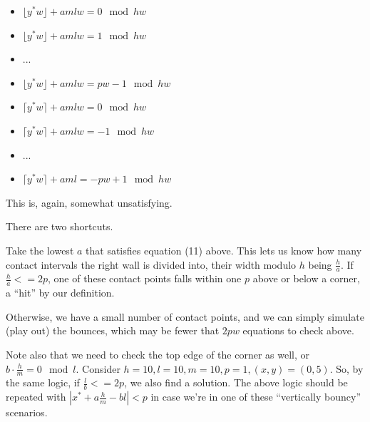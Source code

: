 \documentclass[11pt, oneside]{article} 	%
\begin{document}
\begin{itemize}
\item $\lfloor y^*w \rfloor + amlw = 0 \mod hw$
\item $\lfloor y^*w \rfloor + amlw = 1 \mod hw$
\item ...
\item $\lfloor y^*w \rfloor + amlw = pw-1 \mod hw$
\item $\lceil y^*w \rceil + amlw = 0 \mod hw$
\item $\lceil y^*w \rceil + amlw = -1 \mod hw$
\item ...
\item $\lceil y^*w \rceil + aml = -pw+1 \mod hw$
\end{itemize}


This is, again, somewhat unsatisfying.  

There are two shortcuts.

Take the lowest $a$ that satisfies equation (11) above.  This lets us know how many contact intervals the right wall is divided into, their width modulo $h$ being $\frac{h}{a}$. If $\frac{h}{a} <= 2p$, one of these contact points falls within one $p$ above or below a corner, a ``hit'' by our definition.

Otherwise, we have a small number of contact points, and we can simply simulate (play out) the bounces, which may be fewer that $2pw$ equations to check above.

Note also that we need to check the top edge of the corner as well, or $b \cdot \frac{h}{m} = 0 \mod l$. Consider $h = 10, l = 10, m = 10, p = 1, (x, y) = (0, 5)$.  So, by the same logic, if $\frac{l}{b} <= 2p$, we also find a solution.  The above logic should be repeated with $| x^* + a\frac{h}{m} - bl | < p$ in case we're in one of these ``vertically bouncy'' scenarios.
\end{document}

